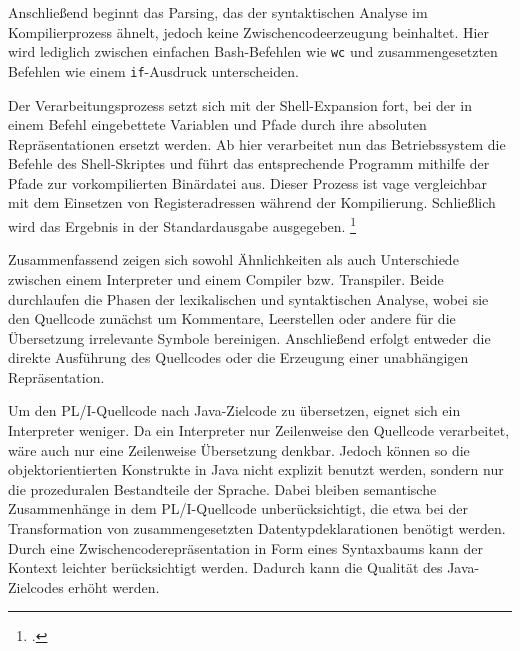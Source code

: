 Anschließend beginnt das Parsing, das der syntaktischen Analyse im Kompilierprozess ähnelt, jedoch keine Zwischencodeerzeugung beinhaltet. Hier wird lediglich zwischen einfachen Bash-Befehlen wie \verb+wc+ und zusammengesetzten Befehlen wie einem \verb+if+-Ausdruck unterscheiden.

Der Verarbeitungsprozess setzt sich mit der Shell-Expansion fort, bei der in einem Befehl eingebettete Variablen und Pfade durch ihre absoluten Repräsentationen ersetzt werden.
Ab hier verarbeitet nun das Betriebssystem die Befehle des Shell-Skriptes und führt das entsprechende Programm mithilfe der Pfade zur vorkompilierten Binärdatei aus. Dieser Prozess ist vage vergleichbar mit dem Einsetzen von Registeradressen während der Kompilierung.
Schließlich wird das Ergebnis in der Standardausgabe ausgegeben. \footcite[Vgl. ][]{gnubash}


Zusammenfassend zeigen sich sowohl Ähnlichkeiten als auch Unterschiede zwischen einem Interpreter und einem Compiler bzw. Transpiler. Beide durchlaufen die Phasen der lexikalischen und syntaktischen Analyse, wobei sie den Quellcode zunächst um Kommentare, Leerstellen oder andere für die Übersetzung irrelevante Symbole bereinigen. Anschließend erfolgt entweder die direkte Ausführung des Quellcodes oder die Erzeugung einer unabhängigen Repräsentation.

Um den PL/I-Quellcode nach Java-Zielcode zu übersetzen, eignet sich ein Interpreter weniger. Da ein Interpreter nur Zeilenweise den Quellcode verarbeitet, wäre auch nur eine Zeilenweise Übersetzung denkbar. 
Jedoch können so die objektorientierten Konstrukte in Java nicht explizit benutzt werden, sondern nur die prozeduralen Bestandteile der Sprache. Dabei bleiben semantische Zusammenhänge in dem PL/I-Quellcode unberücksichtigt, die etwa bei der Transformation von zusammengesetzten Datentypdeklarationen benötigt werden. 
Durch eine Zwischencoderepräsentation in Form eines Syntaxbaums kann der Kontext leichter berücksichtigt werden. Dadurch kann die Qualität des Java-Zielcodes erhöht werden.



